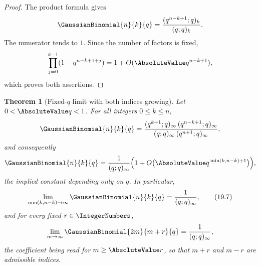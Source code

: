 \documentclass[11pt,a4paper,oneside,openany]{book}
\newtheorem{theorem}{Theorem}[chapter]
\theoremstyle{definition}
\theoremstyle{remark}
\begin{document}
\begin{proof}
The product formula gives
\[
 \GaussianBinomial{n}{k}{q}=\frac{(q^{n-k+1};q)_k}{(q;q)_k}.
\]
The numerator tends to $1$.  Since the number of factors is fixed,
\[
 \prod_{j=0}^{k-1}(1-q^{n-k+1+j})
 =1+O(\AbsoluteValue q^{n-k+1}),
\]
which proves both assertions.
\end{proof}

\begin{theorem}[Fixed-$q$ limit with both indices growing]\label{thm:central-fixed-q}
Let $0<\AbsoluteValue q<1$.  For all integers $0\le k\le n$,
\[
 \GaussianBinomial{n}{k}{q}
 =\frac{(q^{k+1};q)_\infty\,(q^{n-k+1};q)_\infty}
       {(q;q)_\infty\,(q^{n+1};q)_\infty},
\]
and consequently
\[
 \GaussianBinomial{n}{k}{q}
 =\frac1{(q;q)_\infty}
 \Bigl(1+O\bigl(\AbsoluteValue q^{\,\min(k,n-k)+1}\bigr)\Bigr),
\]
the implied constant depending only on $q$.  In particular,
\[
 \lim_{\min(k,n-k)\to\infty}\GaussianBinomial{n}{k}{q}=\frac1{(q;q)_\infty},
 \tag{19.7}\label{eq:central-fixed-q}
\]
and for every fixed $r\in\IntegerNumbers$,
\[
 \lim_{m\to\infty}\GaussianBinomial{2m}{m+r}{q}=\frac1{(q;q)_\infty},
\]
the coefficient being read for $m\ge\AbsoluteValue r$, so that $m+r$ and $m-r$ are
admissible indices.
\end{theorem}
\end{document}
